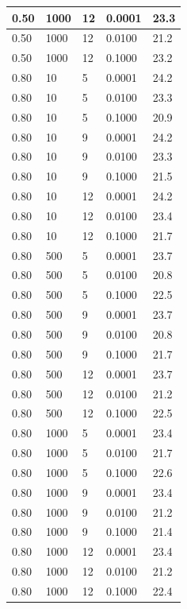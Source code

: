 \begin{table}[h!]
\begin{center}
\begin{tabular}{|l|l|l|l|l|}
\hline 0.50 & 1000 & 12 & 0.0001 & 23.3 \\
\hline 0.50 & 1000 & 12 & 0.0100 & 21.2 \\
\hline 0.50 & 1000 & 12 & 0.1000 & 23.2 \\
\hline 0.80 & 10 & 5 & 0.0001 & 24.2 \\
\hline 0.80 & 10 & 5 & 0.0100 & 23.3 \\
\hline 0.80 & 10 & 5 & 0.1000 & 20.9 \\
\hline 0.80 & 10 & 9 & 0.0001 & 24.2 \\
\hline 0.80 & 10 & 9 & 0.0100 & 23.3 \\
\hline 0.80 & 10 & 9 & 0.1000 & 21.5 \\
\hline 0.80 & 10 & 12 & 0.0001 & 24.2 \\
\hline 0.80 & 10 & 12 & 0.0100 & 23.4 \\
\hline 0.80 & 10 & 12 & 0.1000 & 21.7 \\
\hline 0.80 & 500 & 5 & 0.0001 & 23.7 \\
\hline 0.80 & 500 & 5 & 0.0100 & 20.8 \\
\hline 0.80 & 500 & 5 & 0.1000 & 22.5 \\
\hline 0.80 & 500 & 9 & 0.0001 & 23.7 \\
\hline 0.80 & 500 & 9 & 0.0100 & 20.8 \\
\hline 0.80 & 500 & 9 & 0.1000 & 21.7 \\
\hline 0.80 & 500 & 12 & 0.0001 & 23.7 \\
\hline 0.80 & 500 & 12 & 0.0100 & 21.2 \\
\hline 0.80 & 500 & 12 & 0.1000 & 22.5 \\
\hline 0.80 & 1000 & 5 & 0.0001 & 23.4 \\
\hline 0.80 & 1000 & 5 & 0.0100 & 21.7 \\
\hline 0.80 & 1000 & 5 & 0.1000 & 22.6 \\
\hline 0.80 & 1000 & 9 & 0.0001 & 23.4 \\
\hline 0.80 & 1000 & 9 & 0.0100 & 21.2 \\
\hline 0.80 & 1000 & 9 & 0.1000 & 21.4 \\
\hline 0.80 & 1000 & 12 & 0.0001 & 23.4 \\
\hline 0.80 & 1000 & 12 & 0.0100 & 21.2 \\
\hline 0.80 & 1000 & 12 & 0.1000 & 22.4 \\
\hline
	\end{tabular}
	\end{center}
\end{table}

